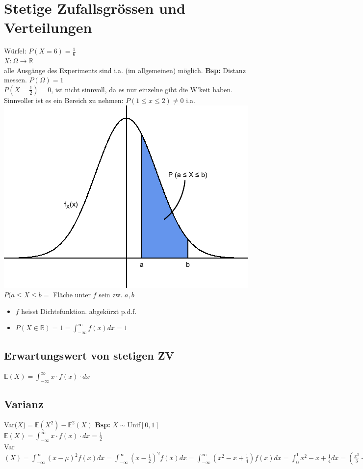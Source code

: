 \documentclass[a4paper,10pt]{article}
\newcommand{\RN}{\mathbb{R}} %
\newcommand{\EN}{\mathbb{E}}
\newcommand{\Bold}[1]{\textbf{#1}} %
\newcommand{\Oneover}[1]{\frac{1}{#1}} %
\begin{document}
\section{Stetige Zufallsgrössen und Verteilungen}
Würfel: $P(X=6)=\Oneover{6}$\\
$X:\Omega\to\RN$\\
alle Ausgänge des Experiments sind i.a. (im allgemeinen) möglich.
\Bold{Bsp:} Distanz messen. $P(\Omega)=1$\\
$P(X=\Oneover{2})=0$, ist nicht sinnvoll, da es nur einzelne gibt die W'keit haben. Sinnvoller ist es ein Bereich zu nehmen: $P(1\leq x\leq 2)\neq 0$ i.a.\\
\includegraphics[scale=0.5]{Integral-dichte.png}\\
$P(a\leq X\leq b=$ Fläche unter $f$ sein zw. $a,b$
\begin{itemize}
 \item $f$ heisst Dichtefunktion. abgekürzt p.d.f.
 \item $P(X\in\RN)=1=\int_{-\infty}^{\infty}f(x)dx=1$
\end{itemize}
\subsection{Erwartungswert von stetigen ZV}
$\EN(X)=\int_{-\infty}^{\infty}x\cdot f(x)\cdot dx$
\subsection{Varianz}
Var($X$)$=\EN(X^2)-\EN^2(X)$
\Bold{Bsp:} $X\sim$Unif$[0,1]$\\
$\EN(X)=\int_{-\infty}^{\infty}x\cdot f(x)\cdot dx=\Oneover{2}$\\
Var$(X)=\int_{-\infty}^{\infty}(x-\mu)^2f(x)dx=\int_{-\infty}^{\infty}(x-\Oneover{2})^2f(x)dx=\int_{-\infty}^{\infty}(x^2-x+\Oneover{4})f(x)dx=\int_{0}^{1}x^2-x+\Oneover{4}dx=(\frac{x^3}{3}-\frac{x^2}{2}+\frac{x}{4})\mid_0^1=\frac{1}{3}-\frac{1}{2}+\frac{1}{4}=\Oneover{12} $
\end{document}
